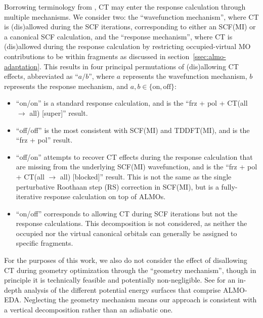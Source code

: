 Borrowing terminology from , CT may enter the response calculation through multiple mechanisms. We consider two: the ``wavefunction mechanism'', where CT is (dis)allowed during the SCF iterations, corresponding to either an SCF(MI) or a canonical SCF calculation, and the ``response mechanism'', where CT is (dis)allowed during the response calculation by restricting occupied-virtual MO contributions to be within fragments as discussed in section~\ref{ssec:almo-adaptation}. This results in four principal permutations of (dis)allowing CT effects, abbreviated as ``\(a/b\)'', where \(a\) represents the wavefunction mechanism, \(b\) represents the response mechanism, and \(a,b\in\{\text{on},\text{off}\}\):

\begin{itemize}
\item ``on/on'' is a standard response calculation, and is the ``frz + pol + CT(all \(\rightarrow\) all) [super]'' result.
\item ``off/off'' is the most consistent with SCF(MI) and TDDFT(MI), and is the ``frz + pol'' result.
\item ``off/on'' attempts to recover CT effects during the response calculation that are missing from the underlying SCF(MI) wavefunction, and is the ``frz + pol + CT(all \(\rightarrow\) all) [blocked]'' result. This is not the same as the single perturbative Roothaan step (RS) correction in SCF(MI), but is a fully-iterative response calculation on top of ALMOs.
\item ``on/off'' corresponds to allowing CT during SCF iterations but not the response calculations. This decomposition is not considered, as neither the occupied nor the virtual canonical orbitals can generally be assigned to specific fragments.
\end{itemize}

For the purposes of this work, we also do not consider the effect of disallowing CT during geometry optimization through the ``geometry mechanism'', though in principle it is technically feasible and potentially non-negligible. See  for an in-depth analysis of the different potential energy surfaces that comprise ALMO-EDA. Neglecting the geometry mechanism means our approach is consistent with a vertical decomposition rather than an adiabatic one.

\section{\texorpdfstring{}{Methods}}
\label{sec:methods}

